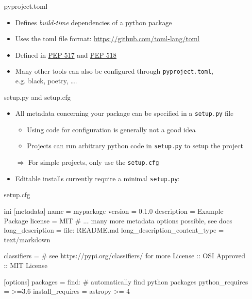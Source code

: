 \begin{frame}[c, fragile]{pyproject.toml}
  \begin{itemize}
    \item Defines \emph{build-time} dependencies of a python package
    \item Uses the toml file format: \url{https://github.com/toml-lang/toml}
    \item Defined in \href{https://www.python.org/dev/peps/pep-0517/}{PEP 517} and \href{https://www.python.org/dev/peps/pep-0518/}{PEP 518}
    \item Many other tools can also be configured through \texttt{pyproject.toml},\\ e.g. black, poetry, \ldots.
  \end{itemize}

\end{frame}

\begin{frame}[c, fragile]{setup.py and setup.cfg}
  \begin{itemize}
    \item All metadata concerning your package can be specified in a \texttt{setup.py} file
      \begin{itemize}
        \item Using code for configuration is generally not a good idea
        \item Projects can run arbitrary python code in \texttt{setup.py} to setup the project
      \end{itemize}
    \item[$\Rightarrow$] For simple projects, only use the \texttt{setup.cfg}
    \item Editable installs currently require a minimal \texttt{setup.py}:
  \end{itemize}
\end{frame}

\begin{frame}[c, fragile]{setup.cfg}
  \begin{code}{ini}
    [metadata]
    name = mypackage
    version = 0.1.0
    description = Example Package
    license = MIT
    # ... many more metadata options possible, see docs
    long_description = file: README.md
    long_description_content_type = text/markdown

    classifiers =
      # see https://pypi.org/classifiers/ for more
      License :: OSI Approved :: MIT License

    [options]
    packages = find:  # automatically find python packages
    python_requires = >=3.6
    install_requires =
      astropy >= 4
  \end{code}
\end{frame}

